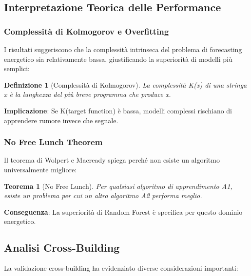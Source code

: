 \documentclass[12pt,a4paper,twoside]{report}
\newtheorem{theorem}{Teorema}[section]
\newtheorem{definition}{Definizione}[section]
\begin{document}
\begin{appendices}
\subsection{Interpretazione Teorica delle Performance}

\subsubsection{Complessità di Kolmogorov e Overfitting}
I risultati suggeriscono che la complessità intrinseca del problema di forecasting energetico sia relativamente bassa, giustificando la superiorità di modelli più semplici:

\begin{definition}[Complessità di Kolmogorov]
La complessità K(x) di una stringa x è la lunghezza del più breve programma che produce x.
\end{definition}

\textbf{Implicazione}: Se K(target function) è bassa, modelli complessi rischiano di apprendere rumore invece che segnale.

\subsubsection{No Free Lunch Theorem}
Il teorema di Wolpert e Macready spiega perché non esiste un algoritmo universalmente migliore:

\begin{theorem}[No Free Lunch]
Per qualsiasi algoritmo di apprendimento A1, esiste un problema per cui un altro algoritmo A2 performa meglio.
\end{theorem}

\textbf{Conseguenza}: La superiorità di Random Forest è specifica per questo dominio energetico.

\subsection{Analisi Cross-Building}

La validazione cross-building ha evidenziato diverse considerazioni importanti:


\end{appendices}
\end{document}
